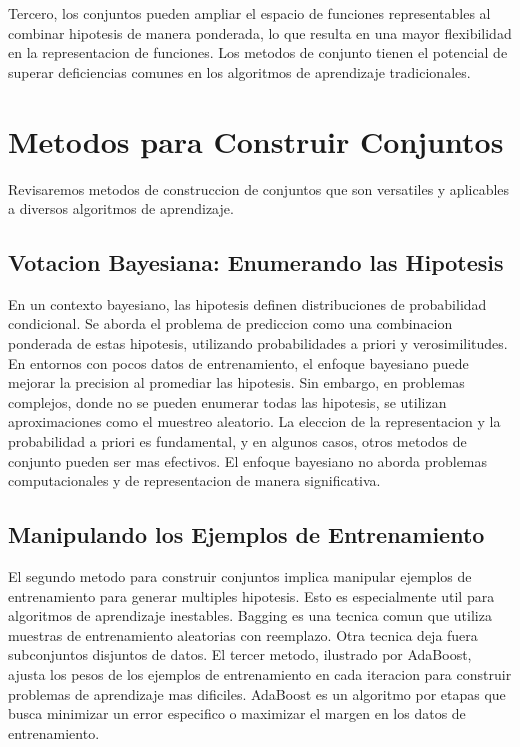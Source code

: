 \documentclass{esannV2}
\begin{document}
Tercero, los conjuntos pueden ampliar el espacio de funciones representables al combinar hipotesis de manera ponderada, lo que resulta en una mayor flexibilidad en la representacion de funciones. Los metodos de conjunto tienen el potencial de superar deficiencias comunes en los algoritmos de aprendizaje tradicionales.

\section{Metodos para Construir Conjuntos }

Revisaremos metodos de construccion de conjuntos que son versatiles y aplicables a diversos algoritmos de aprendizaje.

\subsection{Votacion Bayesiana: Enumerando las Hipotesis}

En un contexto bayesiano, las hipotesis definen distribuciones de probabilidad condicional. Se aborda el problema de prediccion como una combinacion ponderada de estas hipotesis, utilizando probabilidades a priori y verosimilitudes. En entornos con pocos datos de entrenamiento, el enfoque bayesiano puede mejorar la precision al promediar las hipotesis. Sin embargo, en problemas complejos, donde no se pueden enumerar todas las hipotesis, se utilizan aproximaciones como el muestreo aleatorio. La eleccion de la representacion y la probabilidad a priori es fundamental, y en algunos casos, otros metodos de conjunto pueden ser mas efectivos. El enfoque bayesiano no aborda problemas computacionales y de representacion de manera significativa.

\subsection{Manipulando los Ejemplos de Entrenamiento}

El segundo metodo para construir conjuntos implica manipular ejemplos de entrenamiento para generar multiples hipotesis. Esto es especialmente util para algoritmos de aprendizaje inestables. Bagging es una tecnica comun que utiliza muestras de entrenamiento aleatorias con reemplazo. Otra tecnica deja fuera subconjuntos disjuntos de datos. El tercer metodo, ilustrado por AdaBoost, ajusta los pesos de los ejemplos de entrenamiento en cada iteracion para construir problemas de aprendizaje mas dificiles. AdaBoost es un algoritmo por etapas que busca minimizar un error especifico o maximizar el margen en los datos de entrenamiento.
\end{document}
